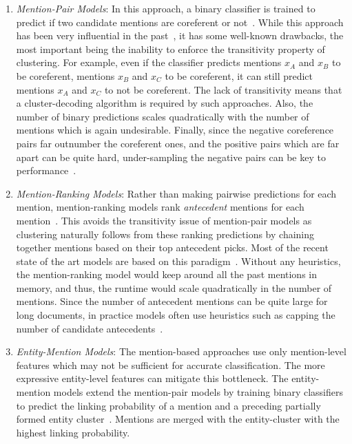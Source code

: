 \documentclass[12pt]{thesis-umich}[thesis]
\begin{document}
\begin{enumerate}
	
	\item \emph{Mention-Pair Models}: In this approach, a binary classifier is trained to predict if two candidate mentions are coreferent or not~\citep{mccarthy95decision}. While this approach has been very influential in the past~\citep{soon-etal-2001-machine, ng-cardie-2002-improving, bengtson-roth-2008-understanding}, it has some well-known drawbacks, the most important being the inability to enforce the transitivity property of clustering. 
	For example, even if the classifier predicts mentions $x_A$ and $x_B$ to be coreferent, mentions $x_B$ and $x_C$ to be coreferent, it can still predict mentions $x_A$ and $x_C$ to not be coreferent. The lack of transitivity means that a cluster-decoding algorithm is required by such approaches. Also, the number of binary predictions scales quadratically with the number of mentions which is again undesirable. 
	Finally, since the negative coreference pairs far outnumber the coreferent ones, and the positive pairs which are far apart can be quite hard, under-sampling the negative pairs can be key to performance~\citep{ng-cardie-2002-improving}.  
	
	\item \emph{Mention-Ranking Models}:
	Rather than making pairwise predictions for each mention, mention-ranking models rank \emph{antecedent} mentions for each mention~\citep{durrett2013easy, wiseman-etal-2015-learning, clark-manning-2016-deep, lee-etal-2017-end}. 	This avoids the transitivity issue of mention-pair models as clustering naturally follows from these ranking predictions by chaining together mentions based on their top antecedent picks. 
	Most of the recent state of the art models are based on this paradigm~\citep{joshi-etal-2020-spanbert, xu-choi-2020-revealing}.
	Without any heuristics, the mention-ranking model would keep around all the past mentions in memory, and thus, the runtime would scale quadratically in the number of mentions. Since the number of antecedent mentions can be quite large for long documents, in practice models often use heuristics such as capping the number of candidate antecedents~\citep{lee-etal-2017-end, lee-etal-2018-higher}.

	
	\item \emph{Entity-Mention Models}: The mention-based approaches use only mention-level features which may not be sufficient for accurate classification. The more expressive entity-level features can mitigate this bottleneck. The entity-mention models extend the mention-pair models by  training binary classifiers to predict the linking probability of a mention and a preceding partially formed entity cluster~\citep{luo-etal-2004-mention, yang-etal-2008-entity}. Mentions are merged with the entity-cluster with the highest linking probability.
	

\end{enumerate}
\end{document}
